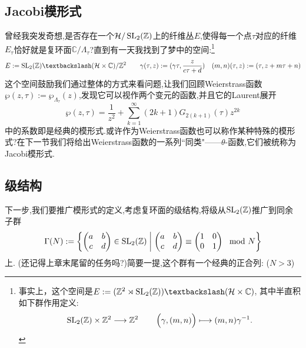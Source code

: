 \subsection{Jacobi模形式}
曾经我突发奇想,是否存在一个$\mathcal{H}/\operatorname{SL}_2(\mathbb{Z})$上的纤维丛$E$,使得每一个点$\tau$对应的纤维$E_\tau$恰好就是复环面$\mathbb{C}/\Lambda_{\tau}$?直到有一天我找到了梦中的空间:\footnote{事实上，这个空间是$E:=(\mathbb{Z}^2 \rtimes \SL_2(\mathbb{Z})) \textbackslash (\mathcal{H} \times \mathbb{C})$, 其中半直积如下群作用定义:
$$\SL_2(\mathbb{Z})  \times \mathbb{Z}^2 \longrightarrow \mathbb{Z}^2 \qquad \left( \gamma,\rule{0mm}{3.7mm} (m,n) \right) \longmapsto (m,n) \gamma^{-1} .$$}
$$E:=\SL_2(\mathbb{Z})\textbackslash (\mathcal{H} \times \mathbb{C})/\mathbb{Z}^2 \qquad \gamma(\tau,z):= (\gamma \tau,\frac{z}{c\tau +d}) \quad (m,n)(\tau,z):=(\tau, z+m\tau+n)$$
这个空间鼓励我们通过整体的方式来看问题,让我们回顾Weierstrass函数$\wp(z,\tau):= \wp_{\Lambda_{\tau}}(z)$,发现它可以视作两个变元的函数,并且它的Laurent展开
$$\wp(z,\tau)=\frac{1}{z^2}+ \sum_{k=1}^{\infty}(2k+1) G_{2(k+1)}(\tau)z^{2k}$$
中的系数即是经典的模形式.或许作为Weierstrass函数也可以称作某种特殊的模形式?在下一节我们将给出Weierstrass函数的一系列``同类"——$\theta$-函数,它们被统称为Jacobi模形式.


\subsection{级结构}
下一步,我们要推广模形式的定义,考虑复环面的级结构,将级从$\operatorname{SL}_2(\mathbb{Z})$推广到同余子群
$$\Gamma(N):=\left\{ \begin{pmatrix}
a &b \\ c & d
\end{pmatrix} \in \operatorname{SL}_2(\mathbb{Z}) \;\middle|\; \begin{pmatrix}
a &b \\ c & d
\end{pmatrix} \equiv \begin{pmatrix}
1 &0 \\ 0 & 1
\end{pmatrix} \mod N  \right\}$$
上. (还记得上章末尾留的任务吗?)简要一提,这个群有一个经典的正合列: ($N>3$)
\begin{center}
\end{center}

